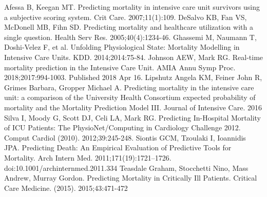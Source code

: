 \documentclass[12pt, final]{article}
\begin{document}
  \begin{thebibliography}{1}
     Afessa B, Keegan MT. Predicting mortality in intensive care unit survivors using a subjective scoring system. Crit Care. 2007;11(1):109.   
     DeSalvo KB, Fan VS, McDonell MB, Fihn SD. Predicting mortality and healthcare utilization with a single question. Health Serv Res. 2005;40(4):1234-46. 
     Ghassemi M, Naumann T, Doshi-Velez F, et al. Unfolding Physiological State: Mortality Modelling in Intensive Care Units. KDD. 2014;2014:75-84.
     Johnson AEW, Mark RG. Real-time mortality prediction in the Intensive Care Unit. AMIA Annu Symp Proc. 2018;2017:994-1003. Published 2018 Apr 16.
     Lipshutz Angela KM, Feiner John R, Grimes Barbara, Gropper Michael A. Predicting mortality in the intensive care unit: a comparison of the University Health Consortium expected probability of mortality and the Mortality Prediction Model III. Journal of Intensive Care. 2016
     Silva I, Moody G, Scott DJ, Celi LA, Mark RG. Predicting In-Hospital Mortality of ICU Patients: The PhysioNet/Computing in Cardiology Challenge 2012. Comput Cardiol (2010). 2012;39:245-248.
	 Siontis GCM, Tzoulaki I, Ioannidis JPA. Predicting Death: An Empirical Evaluation of Predictive Tools for Mortality. Arch Intern Med. 2011;171(19):1721–1726. doi:10.1001/archinternmed.2011.334
	 Teasdale Graham, Stocchetti Nino, Mass Andrew, Murray Gordon. Predicting Mortality in Critically Ill Patients. Critical Care Medicine. (2015). 2015;43:471-472
  
  \end{thebibliography}
\end{document}
